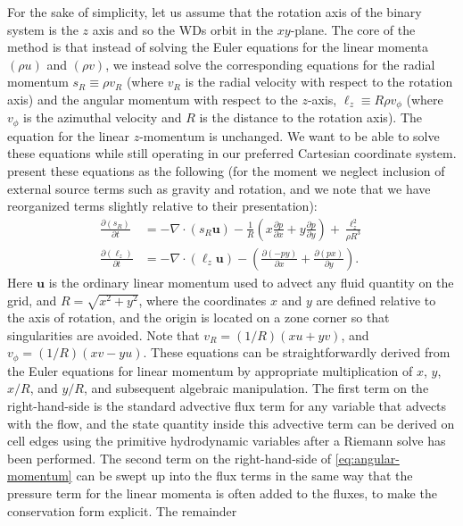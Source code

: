 \documentclass[twocolumn,numberedappendix]{../aastex60}
\begin{document}
For the sake of simplicity, let us assume that the rotation axis of the binary system is the $z$
axis and so the WDs orbit in the $xy$-plane. The core of the method is that instead
of solving the Euler equations for the linear momenta $(\rho u)$ and $(\rho v)$,
we instead solve the corresponding equations for the radial momentum
$s_R \equiv \rho v_R$ (where $v_R$ is the radial velocity with respect to the
rotation axis) and the angular momentum with respect to the $z$-axis,
$\ell_z \equiv R\rho v_\phi$ (where $v_\phi$ is the azimuthal velocity
and $R$ is the distance to the rotation axis).
The equation for the linear $z$-momentum is unchanged. We want to be able
to solve these equations while still operating in our preferred Cartesian
coordinate system. \cite{byerly:2014} present these equations as the following
(for the moment we neglect inclusion of external source terms such as gravity and rotation,
and we note that we have reorganized terms slightly relative to their presentation):
\begin{align}
  \frac{\partial(s_R)}{\partial t} &= -\nabla \cdot (s_R \mathbf{u})
    - \frac{1}{R}\left(x \frac{\partial p}{\partial x} + y \frac{\partial p}{\partial y}\right)
    + \frac{\ell_z^2}{\rho R^3} \label{eq:radial-momentum}\\
    \frac{\partial(\ell_z)}{\partial t} &= -\nabla \cdot (\ell_z \mathbf{u}) - \left(\frac{\partial (-py)}{\partial x} + \frac{\partial(px)}{\partial y}\right).\label{eq:angular-momentum}
\end{align}
Here $\mathbf{u}$ is the ordinary linear momentum used to advect any fluid quantity
on the grid, and $R = \sqrt{x^2 + y^2}$, where the coordinates $x$ and $y$ are defined
relative to the axis of rotation, and the origin is located on a zone corner
so that singularities are avoided. Note that $v_R = (1 / R)(x u + y v)$, and
$v_\phi = (1/R)(x v - y u)$. These equations can be straightforwardly derived from
the Euler equations for linear momentum by appropriate multiplication of $x$, $y$,
$x / R$, and $y/R$, and subsequent algebraic manipulation. The first term on the
right-hand-side is the standard advective flux term for any variable that advects with
the flow, and the state quantity inside this advective term can be derived on cell edges
using the primitive hydrodynamic variables after a Riemann solve has been performed.
The second term on the right-hand-side of \autoref{eq:angular-momentum} can be swept up
into the flux terms in the same way that the pressure term for the linear momenta
is often added to the fluxes, to make the conservation form explicit. The remainder
\end{document}
